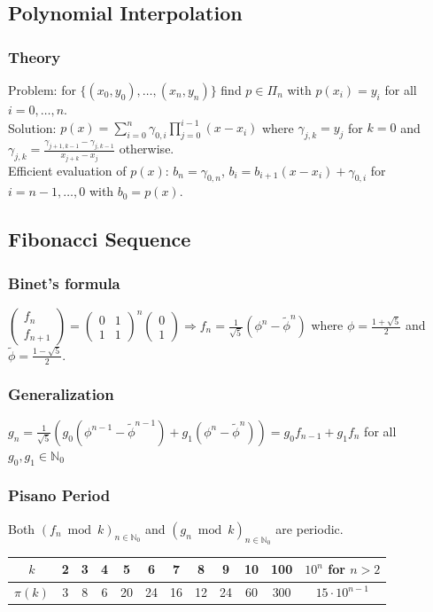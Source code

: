 \documentclass[10pt,a4paper,ngerman,oneside,]{article}
\begin{document}
\begin{multicols}{2}
\subsection{Polynomial Interpolation}
\subsubsection{Theory}
Problem: for $\{(x_0,y_0),\ldots, (x_n, y_n) \}$ find $p \in \Pi_{n}$ with $p(x_i) = y_i$ for all $i=0,\ldots,n$.\\
Solution: $p(x) = \sum\limits_{i=0}^n \gamma_{0,i} \prod\limits_{j=0}^{i-1} (x-x_i)$ where $\gamma_{j,k} = y_j$ for $k = 0$ and $\gamma_{j,k} = \frac { \gamma_{j+1,k-1} - \gamma_{j,k-1} }{x_{j+k}-x_j}$ otherwise. \\
Efficient evaluation of $p(x)$: $b_n = \gamma_{0,n}$, $b_i = b_{i+1}(x-x_i) + \gamma_{0,i}$ for $i=n-1,\ldots,0$ with $b_0 = p(x)$.
\subsection{Fibonacci Sequence}
\subsubsection{Binet's formula}
$
\begin{pmatrix}
f_n \\
f_{n+1}
\end{pmatrix} =
\begin{pmatrix}
0 & 1 \\
1 & 1
\end{pmatrix}^n
\begin{pmatrix}
0 \\
1
\end{pmatrix}
\Rightarrow
f_n = \frac{1}{\sqrt{5}} (\phi^n - \tilde{\phi}^n)$ where $\phi = \frac{1+\sqrt{5}}{2}$ and $\tilde{\phi} = \frac{1-\sqrt{5}}{2}$.
\subsubsection{Generalization}
$g_n = \frac{1}{\sqrt{5}} (g_0 (\phi^{n-1} - \tilde{\phi}^{n-1}) + g_1 (\phi^n - \tilde{\phi}^n)) = g_0 f_{n-1} + g_1 f_n$ for all $g_0, g_1 \in \mathbb{N}_0$

\subsubsection{Pisano Period}
Both $(f_n \bmod k)_{n \in \mathbb{N}_0}$ and $(g_n \bmod k)_{n \in \mathbb{N}_0}$ are periodic.
\begin{table}[htbp]
\begin{tabular}{| c || c | c | c | c | c | c | c | c | c | c | c | }
\hline
$k$ & 2 & 3 & 4 & 5 & 6 & 7 & 8 & 9 & 10 & 100 & $10^n$ for $n >2$ \\
\hline
$\pi(k)$ & 3 & 8 & 6 & 20 & 24 & 16 & 12 & 24 & 60 & 300 & $15 \cdot 10^{n-1}$ \\
\hline
\end{tabular}
\end{table}


\end{multicols}
\end{document}
